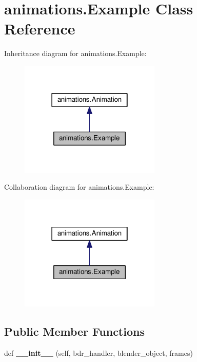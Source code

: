 \hypertarget{classanimations_1_1Example}{}\section{animations.\+Example Class Reference}
\label{classanimations_1_1Example}


Inheritance diagram for animations.\+Example\+:\nopagebreak
\begin{figure}[H]
\begin{center}
\leavevmode
\includegraphics[width=190pt]{classanimations_1_1Example__inherit__graph}
\end{center}
\end{figure}


Collaboration diagram for animations.\+Example\+:\nopagebreak
\begin{figure}[H]
\begin{center}
\leavevmode
\includegraphics[width=190pt]{classanimations_1_1Example__coll__graph}
\end{center}
\end{figure}
\subsection*{Public Member Functions}
\begin{DoxyCompactItemize}
\item 
def {\bfseries \+\_\+\+\_\+init\+\_\+\+\_\+} (self, bdr\+\_\+handler, blender\+\_\+object, frames)\hypertarget{classanimations_1_1Example_ace7bc4cd0298fadf147fc372ca255b43}{}\label{classanimations_1_1Example_ace7bc4cd0298fadf147fc372ca255b43}

\end{DoxyCompactItemize}
